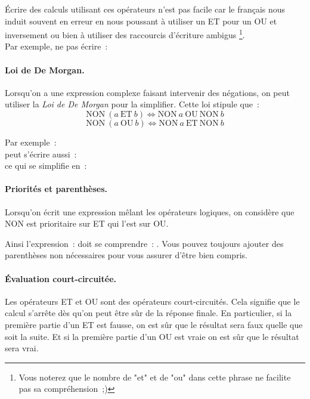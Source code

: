 			Écrire des calculs utilisant ces opérateurs n’est pas facile
			car le français nous induit souvent en erreur
			en nous poussant à utiliser un ET pour un OU et inversement
			ou bien à utiliser des raccourcis d’écriture ambigus%
			\footnote{%
				Vous noterez que le nombre de "et" et de "ou"
				dans cette phrase ne facilite pas sa compréhension~;)%
			}. 
			\\Par exemple, ne pas écrire~: 
	
			\paragraph{Loi de De Morgan.}
				Lorsqu’on a une expression complexe faisant intervenir
				des négations, on peut utiliser la \emph{Loi de De Morgan}
				pour la simplifier.
				Cette loi stipule que~:
				\[
					\mathrm{NON}\ (a\ \mathrm{ET}\ b) \Leftrightarrow \mathrm{NON}\ a\ \mathrm{OU}\ \mathrm{NON}\ b
				\]
				\[
					\mathrm{NON}\ (a\ \mathrm{OU}\ b) \Leftrightarrow \mathrm{NON}\ a\ \mathrm{ET}\ \mathrm{NON}\ b
				\]
				
				Par exemple~: 
				\\peut s’écrire aussi~: 
				\\ce qui se simplifie en~: 
	
			\paragraph{Priorités et parenthèses.}
				Lorsqu’on écrit une expression mêlant les opérateurs logiques,
				on considère que NON est prioritaire sur ET qui l’est sur OU.
				
				Ainsi l’expression~: 
				doit se comprendre~: .
				Vous pouvez toujours ajouter des parenthèses non nécessaires
				pour vous assurer d’être bien compris.

			\paragraph{Évaluation court-circuitée.}\label{court-circuit}
			
				Les opérateurs ET et OU sont des opérateurs court-circuités.
				Cela signifie que le calcul s’arrête dès qu’on peut être sûr
				de la réponse finale.
				En particulier, si la première partie d’un ET est fausse,
				on est sûr que le résultat sera faux quelle que soit la suite.
				Et si la première partie d’un OU est vraie 
				on est sûr que le résultat sera vrai.
				
